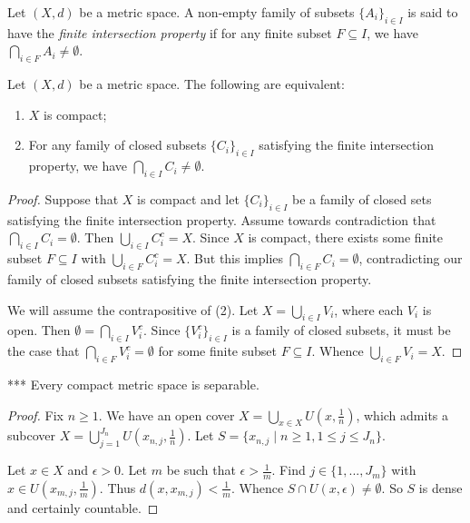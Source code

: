     \begin{definition}
        Let $(X,d)$ be a metric space. A non-empty family of subsets $\{A_i\}_{i \in I}$ is said to have the \textit{finite intersection property} if for any finite subset $F \subseteq I$, we have $\bigcap_{i \in F}A_i \neq \emptyset$.
    \end{definition}

    \begin{proposition}\label{prop:closed-fip}
        Let $(X,d)$ be a metric space. The following are equivalent:
            \begin{enumerate}[label = (\arabic*),itemsep=1pt,topsep=3pt]
                \item $X$ is compact;
                \item For any family of closed subsets $\{C_i\}_{i \in I}$ satisfying the finite intersection property, we have $\bigcap_{i \in I}C_i \neq \emptyset$.
            \end{enumerate}
    \end{proposition}
        \begin{proof}
            Suppose that $X$ is compact and let $\{C_i\}_{i \in I}$ be a family of closed sets satisfying the finite intersection property. Assume towards contradiction that $\bigcap_{i \in I}C_i = \emptyset$. Then $\bigcup_{i \in I}C_i^c = X$. Since $X$ is compact, there exists some finite subset $F \subseteq I$ with $\bigcup_{i \in F}C_i^c = X$. But this implies $\bigcap_{i \in F}C_i = \emptyset$, contradicting our family of closed subsets satisfying the finite intersection property.

            We will assume the contrapositive of (2). Let $X = \bigcup_{i \in I}V_i$, where each $V_i$ is open. Then $\emptyset = \bigcap_{i \in I}V_i^c$. Since $\{V_i^c\}_{i \in I}$ is a family of closed subsets, it must be the case that $\bigcap_{i \in F}V_i^c = \emptyset$ for some finite subset $F \subseteq I$. Whence $\bigcup_{i \in F}V_i = X$.
        \end{proof}

    \begin{proposition}***
        Every compact metric space is separable.
    \end{proposition}
        \begin{proof}
            Fix $n \geq 1$. We have an open cover $X = \bigcup_{x \in X}U(x,\frac{1}{n})$, which admits a subcover $X = \bigcup_{j = 1}^{J_n} U\left(x_{n,j}, \frac{1}{n}\right)$. Let $S = \{x_{n,j} \mid n \geq 1, 1 \leq j \leq J_n\}$. 

            Let $x \in X$ and $\epsilon > 0$. Let $m$ be such that $\epsilon > \frac{1}{m}$. Find $j \in \{1,...,J_m\}$ with $x \in U(x_{m,j},\frac{1}{m})$. Thus $d(x,x_{m,j})< \frac{1}{m}$. Whence $S \cap U(x,\epsilon) \neq \emptyset$. So $S$ is dense and certainly countable.
        \end{proof}

